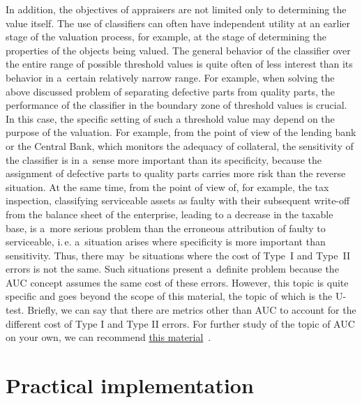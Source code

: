\documentclass[]{scrreprt}
\begin{document}
In addition, the objectives of appraisers are not limited only to determining the value itself. The use of classifiers can often have independent utility at an earlier stage of the valuation process, for example, at the stage of determining the properties of the objects being valued. The general behavior of the classifier over the entire range of possible threshold values is quite often of less interest than its behavior in a~certain relatively narrow range. For example, when solving the above discussed problem of separating defective parts from quality parts, the performance of the classifier in the boundary zone of threshold values is crucial. In this case, the specific setting of such a threshold value may depend on the purpose of the valuation. For example, from the point of view of the lending bank or the Central Bank, which monitors the adequacy of collateral, the sensitivity of the classifier is in a~sense more important than its specificity, because the assignment of defective parts to quality parts carries more risk than the reverse situation. At the same time, from the point of view of, for example, the tax inspection, classifying serviceable assets as faulty with their subsequent write-off from the balance sheet of the enterprise, leading to a decrease in the taxable base, is a~more serious problem than the erroneous attribution of faulty to serviceable, i.\,e. a~situation arises where specificity is more important than sensitivity. Thus, there may~be situations where the cost of Type~I and Type~II errors is not the same. Such situations present a~definite problem because the AUC concept assumes the same cost of these errors. However, this topic is quite specific and goes beyond the scope of this material, the topic of which is the U-test. Briefly, we can say that there are metrics other than AUC to account for the different cost of Type I and Type II errors. For further study of the topic of AUC on your own, we can recommend \href{http://nicolas.kruchten.com/content/2016/01/ml-meets-economics/}{this material}~\cite{ML-meets-economics}.
%
\chapter{Practical implementation}\label{U-test-practice}
%
\end{document}
